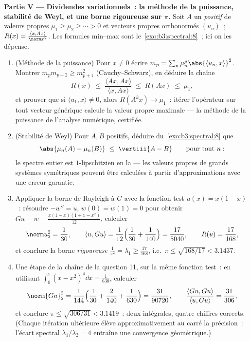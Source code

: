 \begin{problem}
\medskip
\noindent\textbf{Partie V --- Dividendes variationnels~: la
méthode de la puissance, stabilité de Weyl, et une borne
rigoureuse sur $\pi$.} Soit $A$ un 
 \emph{positif} de valeurs propres $\mu_1 \geq
\mu_2 \geq \cdots > 0$ et vecteurs propres orthonormés
$(u_n)$~; $R(x) = \frac{\langle x, Ax\rangle}{\norm x^2}$.
Les formules min--max sont le~\cref{exo:b3:spectral:8}~; ici
on les dépense.
\begin{enumerate}[resume]
  \item (Méthode de la puissance) Pour $x \neq 0$ écrire $m_p
        = \sum_n\mu_n^p\abs{\langle u_n, x\rangle}^2$.
        Montrer $m_pm_{p+2} \geq m_{p+1}^2$
        (Cauchy--Schwarz), en déduire la chaîne
        \[
        R(x) \;\leq\; \frac{\langle Ax, Ax\rangle}{\langle x,
        Ax\rangle} \;\leq\; R(Ax) \;\leq\; \mu_1,
        \]
        et prouver que si $\langle u_1, x\rangle \neq 0$,
        alors $R(A^kx) \to \mu_1$~: itérer l'opérateur sur
        tout vecteur générique calcule la valeur propre
        maximale --- la méthode de la puissance de l'analyse
        numérique, certifiée.
  \item (Stabilité de Weyl) Pour $A, B$ 
         positifs, déduire du~\cref{exo:b3:spectral:8} que
        \[
        \abs{\mu_n(A) - \mu_n(B)} \;\leq\; \vertiii{A - B}
        \qquad\text{pour tout } n :
        \]
        le spectre entier est $1$-lipschitzien en la  --- les valeurs propres de grands
        systèmes symétriques peuvent être calculées à partir
        d'approximations avec une erreur garantie.
  \item Appliquer la borne de Rayleigh à $G$ avec la fonction
        test $u(x) = x(1-x)$~: résoudre $-w'' = u$, $w(0) =
        w(1) = 0$ pour obtenir $Gu = w = \frac{x(1-x)(1 + x -
        x^2)}{12}$, calculer
        \[
        \norm u_2^2 = \frac1{30}, \qquad
        \langle u, Gu\rangle = \frac1{12}\Bigl(\frac1{30} +
        \frac1{140}\Bigr) = \frac{17}{5040},
        \qquad R(u) = \frac{17}{168},
        \]
        et conclure la borne \emph{rigoureuse} $\frac1{\pi^2}
        = \lambda_1 \geq \frac{17}{168}$, i.e.\ $\pi \leq
        \sqrt{168/17} < 3.1437$.
  \item Une étape de la chaîne de la question 11, sur la même
        fonction test~: en utilisant $\int_0^1(x - x^2)^4\dd
        x = \frac1{630}$, calculer
        \[
        \norm{Gu}_2^2 = \frac1{144}\Bigl(\frac1{30} +
        \frac2{140} + \frac1{630}\Bigr) = \frac{31}{90720},
        \qquad
        \frac{\langle Gu, Gu\rangle}{\langle u, Gu\rangle} =
        \frac{31}{306},
        \]
        et conclure $\pi \leq \sqrt{306/31} < 3.1419$~: deux
        intégrales, quatre chiffres corrects. (Chaque
        itération ultérieure élève approximativement au
        carré la précision~: l'écart spectral
        $\lambda_1/\lambda_2 = 4$ entraîne une convergence
        géométrique.)
\end{enumerate}


\end{problem}
